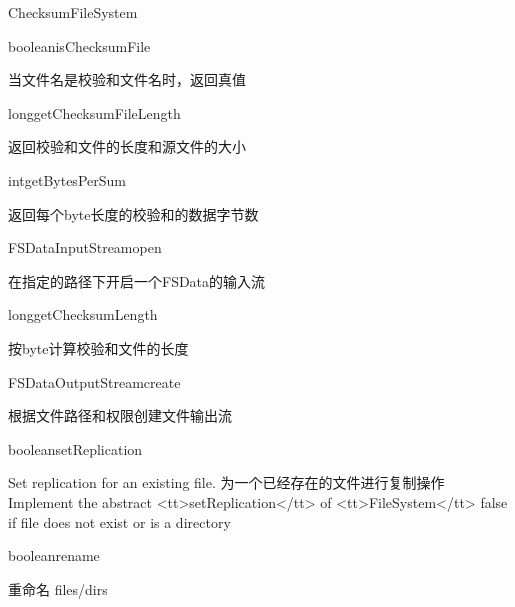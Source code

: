 \begin{XeClass}{ChecksumFileSystem}
    \begin{XeMethod}{\XePublic}{boolean}{isChecksumFile}
         
 当文件名是校验和文件名时，返回真值

    \end{XeMethod}

    \begin{XeMethod}{\XePublic}{long}{getChecksumFileLength}
         
 返回校验和文件的长度和源文件的大小

    \end{XeMethod}

    \begin{XeMethod}{\XePublic}{int}{getBytesPerSum}
         
 返回每个byte长度的校验和的数据字节数

    \end{XeMethod}

    \begin{XeMethod}{\XePublic}{FSDataInputStream}{open}
         
 在指定的路径下开启一个FSData的输入流

    \end{XeMethod}

    \begin{XeMethod}{\XePublic}{long}{getChecksumLength}
         
 按byte计算校验和文件的长度

    \end{XeMethod}

    \begin{XeMethod}{\XePublic}{FSDataOutputStream}{create}
         
 根据文件路径和权限创建文件输出流

    \end{XeMethod}

    \begin{XeMethod}{\XePublic}{boolean}{setReplication}
         
 Set replication for an existing file.
 为一个已经存在的文件进行复制操作
 Implement the abstract <tt>setReplication</tt> of <tt>FileSystem</tt>
 false if file does not exist or is a directory

    \end{XeMethod}

    \begin{XeMethod}{\XePublic}{boolean}{rename}
         
 重命名 files/dirs


\end{XeMethod}
\end{XeClass}
